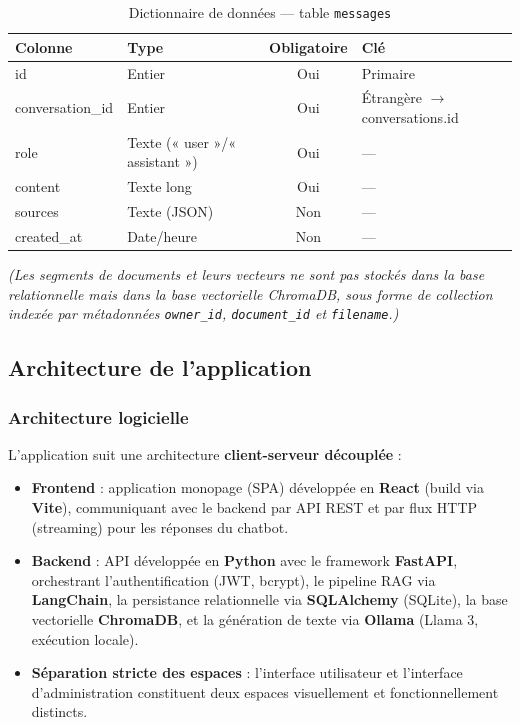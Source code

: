 \documentclass[12pt,a4paper]{report}
\begin{document}
\begin{table}[h]
\centering
\caption{Dictionnaire de données — table \texttt{messages}}
\begin{tabular}{|l|l|c|l|}
\hline
\textbf{Colonne} & \textbf{Type} & \textbf{Obligatoire} & \textbf{Clé} \\
\hline
id & Entier & Oui & Primaire \\
conversation\_id & Entier & Oui & Étrangère $\rightarrow$ conversations.id \\
role & Texte (« user »/« assistant ») & Oui & — \\
content & Texte long & Oui & — \\
sources & Texte (JSON) & Non & — \\
created\_at & Date/heure & Non & — \\
\hline
\end{tabular}
\end{table}

\textit{(Les segments de documents et leurs vecteurs ne sont pas stockés dans la base relationnelle mais dans la base vectorielle ChromaDB, sous forme de collection indexée par métadonnées \texttt{owner\_id}, \texttt{document\_id} et \texttt{filename}.)}

\subsection{Architecture de l'application}

\subsubsection{Architecture logicielle}
L'application suit une architecture \textbf{client-serveur découplée} :
\begin{itemize}
  \item \textbf{Frontend} : application monopage (SPA) développée en \textbf{React} (build via \textbf{Vite}), communiquant avec le backend par API REST et par flux HTTP (streaming) pour les réponses du chatbot.
  \item \textbf{Backend} : API développée en \textbf{Python} avec le framework \textbf{FastAPI}, orchestrant l'authentification (JWT, bcrypt), le pipeline RAG via \textbf{LangChain}, la persistance relationnelle via \textbf{SQLAlchemy} (SQLite), la base vectorielle \textbf{ChromaDB}, et la génération de texte via \textbf{Ollama} (Llama 3, exécution locale).
  \item \textbf{Séparation stricte des espaces} : l'interface utilisateur et l'interface d'administration constituent deux espaces visuellement et fonctionnellement distincts.
\end{itemize}
\end{document}

